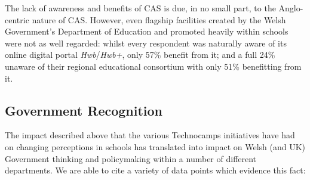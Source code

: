 \documentclass{sig-alternate}
\begin{document}
The lack of awareness and benefits of CAS is due, in no small part, to
the Anglo-centric nature of CAS.  However, even flagship facilities
created by the Welsh Government's Department of Education and promoted
heavily within schools were not as well regarded: whilst every
respondent was naturally aware of its online digital portal
{\emph{Hwb}}/{\emph{Hwb+}}, only 57\% benefit from it; and a full 24\%
unaware of their regional educational consortium with only 51\%
benefitting from it.

\subsection{Government Recognition}\label{govrecog}

The impact described above that the various Technocamps initiatives
have had on changing perceptions in schools has translated into impact
on Welsh (and UK) Government thinking and policymaking within a number
of different departments. We are able to cite a variety of data points
which evidence this fact:
\end{document}
